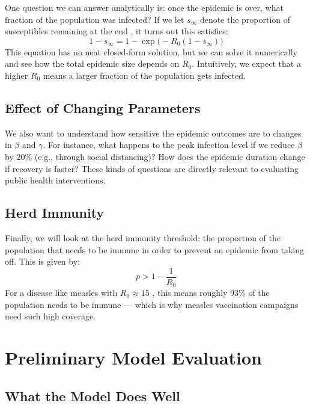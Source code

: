 \documentclass[11pt]{article}
\begin{document}
One question we can answer analytically is: once the epidemic is over, what fraction of the population was infected? If we let $s_\infty$ denote the proportion of susceptibles remaining at the end \cite{hethcote2000}, it turns out this satisfies:
\begin{equation}
    1 - s_\infty = 1 - \exp\!\bigl(-R_0(1 - s_\infty)\bigr)
\end{equation}
This equation has no neat closed-form solution, but we can solve it numerically and see how the total epidemic size depends on $R_0$. Intuitively, we expect that a higher $R_0$ means a larger fraction of the population gets infected.

\subsection{Effect of Changing Parameters}

We also want to understand how sensitive the epidemic outcomes are to changes in $\beta$ and $\gamma$. For instance, what happens to the peak infection level if we reduce $\beta$ by 20\% (e.g., through social distancing)? How does the epidemic duration change if recovery is faster? These kinds of questions are directly relevant to evaluating public health interventions.

\subsection{Herd Immunity}

Finally, we will look at the herd immunity threshold: the proportion of the population that needs to be immune in order to prevent an epidemic from taking off. This is given by:
\begin{equation}
    p > 1 - \frac{1}{R_0}
\end{equation}
For a disease like measles with $R_0 \approx 15$ \cite{anderson1982}, this means roughly 93\% of the population needs to be immune --- which is why measles vaccination campaigns need such high coverage.

\section{Preliminary Model Evaluation}

\subsection{What the Model Does Well}
\end{document}

